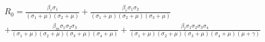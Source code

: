 \begin{align*}
&R_0 = \frac{\beta_r \sigma_{1}}{{\left(\sigma_{1} + \mu\right)} {\left(\sigma_{2} + \mu\right)}} + \frac{\beta_e \sigma_{1} \sigma_{2}}{{\left(\sigma_{1} + \mu\right)} {\left(\sigma_{2} + \mu\right)} {\left(\sigma_{3} + \mu\right)}}\\ 
&+ \frac{\beta_m \sigma_{1} \sigma_{2} \sigma_{3}}{{\left(\sigma_{1} + \mu\right)} {\left(\sigma_{2} + \mu\right)} {\left(\sigma_{3} + \mu\right)} {\left(\sigma_{4} + \mu\right)}} + \frac{\beta_l \sigma_{1} \sigma_{2} \sigma_{3} \sigma_{4}}{{\left(\sigma_{1} + \mu\right)} {\left(\sigma_{2} + \mu\right)} {\left(\sigma_{3} + \mu\right)} {\left(\sigma_{4} + \mu\right)} {\left(\mu + \gamma\right)}}
\end{align*}